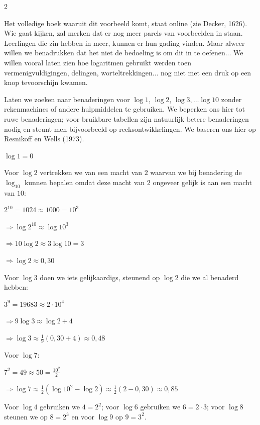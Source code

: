 \begin{multicols}{2}

Het volledige boek waaruit dit voorbeeld komt, staat online (zie Decker, 1626). Wie gaat kijken, zal merken dat er nog meer parels van voorbeelden in staan. Leerlingen die zin hebben in meer, kunnen er hun gading vinden. Maar alweer willen we benadrukken dat het niet de bedoeling is om dit in te oefenen... We willen vooral laten zien hoe logaritmen gebruikt werden toen vermenigvuldigingen, delingen, worteltrekkingen... nog niet met een druk op een knop tevoorschijn kwamen.


Laten we zoeken naar benaderingen voor $\log1$, $\log2$, $\log3, \ldots \log10$ zonder rekenmachines of andere hulpmiddelen te gebruiken. We beperken ons hier tot ruwe benaderingen; voor bruikbare tabellen zijn natuurlijk betere benaderingen nodig en steunt men bijvoorbeeld op reeksontwikkelingen. We baseren ons hier op Resnikoff en Wells (1973).

$\log 1 =0$

Voor $\log 2$ vertrekken we van een macht van $2$ waarvan we bij benadering de $\log_{10}$ kunnen bepalen omdat deze macht van $2$ ongeveer gelijk is aan een macht van $10$:

$2^{10}=1024\approx 1000=10^3$

$\Rightarrow\log 2^{10} \approx \log 10^3$

$\Rightarrow 10 \log 2\approx 3 \log 10 = 3$

$\Rightarrow \log 2\approx 0,30$

Voor $\log 3$ doen we iets gelijkaardigs, steunend op $\log 2$ die we al benaderd hebben:


$3^9=19683\approx 2\cdot 10^4$

$\Rightarrow 9 \log 3 \approx \log 2 + 4$

$\Rightarrow \log 3 \approx \frac{1}{9} (0,30 + 4)\approx 0,48$

Voor $\log 7$:

$7^2=49\approx 50=\frac{10^2}{2}$

$\Rightarrow \log 7\approx \frac {1}{2}(\log 10^2-\log 2)\approx \frac{1}{2}(2-0,30)\approx 0,85$

Voor $\log 4$ gebruiken we $4=2^2$; voor $\log 6$ gebruiken we $6=2\cdot 3$; voor $\log 8$ steunen we op $8=2^3$ en voor $\log 9$ op $9=3^2$.



\end{multicols}
